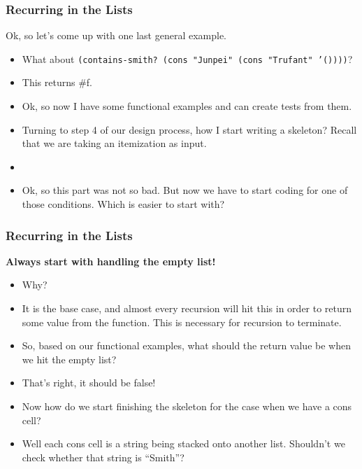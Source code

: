 \documentclass{beamer}
\begin{document}

\begin{frame}
  \frametitle{Recurring in the Lists}
  Ok, so let's come up with one last general example.
  \begin{itemize}
  \item<2-> What about \texttt{(contains-smith? (cons "Junpei" (cons "Trufant" '())))}?
  \item<3-> This returns \#f.
  \item<4-> Ok, so now I have some functional examples and can create tests from them.
  \item<5-> Turning to step 4 of our design process, how I start writing a
    skeleton? Recall that we are taking an itemization as input.
  \item<6-> \ContainsSkeleton
  \item<7-> Ok, so this part was not so bad. But now we have to start coding
    for one of those conditions. Which is easier to start with?
  \end{itemize}
\end{frame}

\begin{frame}
  \frametitle{Recurring in the Lists}
  \textbf{Always start with handling the empty list!}
  \begin{itemize}
  \item<2-> Why?
  \item<3-> It is the base case, and almost every recursion will hit
    this in order to return some value from the function. This is necessary
    for recursion to terminate.
  \item<4-> So, based on our functional examples, what should the return value
    be when we hit the empty list?
  \item<5-> That's right, it should be false!
  \item<6-> Now how do we start finishing the skeleton for the case when
    we have a cons cell?
  \item<7-> Well each cons cell is a string being stacked onto another list. Shouldn't we check whether that string is ``Smith''?
  \end{itemize}
\end{frame}
\end{document}
